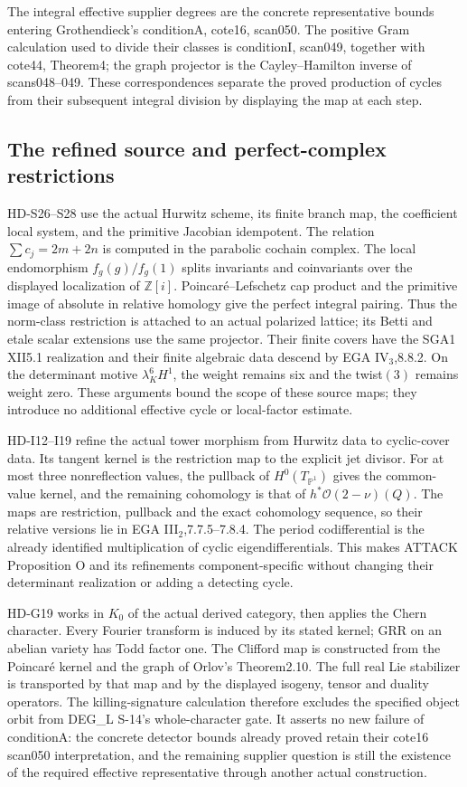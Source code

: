 The integral effective supplier degrees are the concrete representative
bounds entering Grothendieck's conditionA, cote16, scan050. The
positive Gram calculation used to divide their classes is conditionI,
scan049, together with cote44, Theorem4; the graph projector is the
Cayley--Hamilton inverse of scans048--049. These correspondences
separate the proved production of cycles from their subsequent
integral division by displaying the map at each step.

\subsection{The refined source and perfect-complex restrictions}

HD-S26--S28 use the actual Hurwitz scheme, its finite branch map, the
coefficient local system, and the primitive Jacobian idempotent.
The relation $\sum c_j=2m+2n$ is computed in the parabolic cochain
complex. The local endomorphism $f_g(g)/f_g(1)$ splits invariants
and coinvariants over the displayed localization of $\mathbb Z[i]$.
Poincar\'e--Lefschetz cap product and the primitive image of absolute
in relative homology give the perfect integral pairing. Thus the
norm-class restriction is attached to an actual polarized lattice;
its Betti and etale scalar extensions use the same projector.
Their finite covers have the SGA1 XII5.1 realization and their
finite algebraic data descend by EGA IV$_3$,8.8.2. On the determinant
motive $\lambda_K^6H^1$, the weight remains six and the twist$(3)$
remains weight zero. These arguments bound the scope of these source
maps; they introduce no additional effective cycle or local-factor
estimate.

HD-I12--I19 refine the actual tower morphism from Hurwitz data to
cyclic-cover data. Its tangent kernel is the restriction map to the
explicit jet divisor. For at most three nonreflection values, the
pullback of $H^0(T_{\mathbb P^1})$ gives the common-value kernel,
and the remaining cohomology is that of
$h^*\mathcal O(2-\nu)(Q)$. The maps are restriction, pullback and
the exact cohomology sequence, so their relative versions lie in
EGA III$_2$,7.7.5--7.8.4. The period codifferential is the already
identified multiplication of cyclic eigendifferentials. This makes
ATTACK Proposition O and its refinements component-specific without
changing their determinant realization or adding a detecting cycle.

HD-G19 works in $K_0$ of the actual derived category, then applies the
Chern character. Every Fourier transform is induced by its stated
kernel; GRR on an abelian variety has Todd factor one. The Clifford
map is constructed from the Poincar\'e kernel and the graph of
Orlov's Theorem2.10. The full real Lie stabilizer is transported by
that map and by the displayed isogeny, tensor and duality operators.
The killing-signature calculation therefore excludes the specified
object orbit from DEG\_L S-14's whole-character gate. It asserts no
new failure of conditionA: the concrete detector bounds already
proved retain their cote16 scan050 interpretation, and the remaining
supplier question is still the existence of the required effective
representative through another actual construction.

